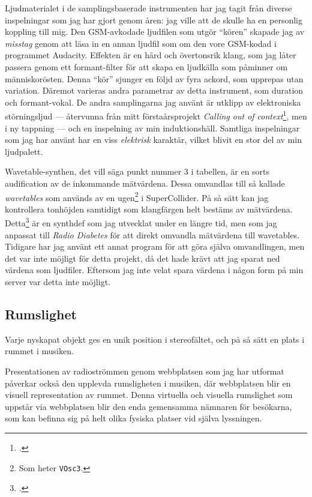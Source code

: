 \documentclass[11pt, a4paper]{article} %
\begin{document}
Ljudmaterialet i de samplingsbaserade instrumenten har jag tagit från diverse inspelningar som jag har gjort genom åren: jag ville att de skulle ha en personlig koppling till mig. Den GSM-avkodade ljudfilen som utgör ``kören'' skapade jag av \emph{misstag} genom att läsa in en annan ljudfil som om den vore GSM-kodad i programmet Audacity. Effekten är en hård och övertonsrik klang, som jag låter passera genom ett formant-filter för att skapa en ljudkälla som påminner om människorösten. Denna ``kör'' sjunger en följd av fyra ackord, som upprepas utan variation. Däremot varieras andra parametrar av detta instrument, som duration och formant-vokal. De andra samplingarna jag använt är utklipp av elektroniska störningsljud --- återvunna från mitt förstaårsprojekt \emph{Calling out of context}\footcite{jondell_calling_2019}, men i ny tappning --- och en inspelning av min induktionshäll. Samtliga inspelningar som jag har använt har en viss \emph{elektrisk} karaktär, vilket blivit en stor del av min ljudpalett. 

Wavetable-synthen, det vill säga punkt nummer 3 i tabellen, är en sorts \gls{audification} av de inkommande mätvärdena. Dessa omvandlas till så kallade \emph{wavetables} som används av en \gls{ugen}\footnote{Som heter \texttt{VOsc3}.} i SuperCollider. På så sätt kan jag kontrollera tonhöjden samtidigt som klangfärgen helt bestäms av mätvärdena. Detta\footcite{jondell_kj-jondelldiabetes-synth_2021} är en \gls{synthdef} som jag utvecklat under en längre tid, men som jag anpassat till \emph{Radio Diabetes} för att direkt omvandla mätvärdena till wavetables. Tidigare har jag använt ett annat program för att göra själva omvandlingen, men det var inte möjligt för detta projekt, då det hade krävt att jag sparat ned värdena som ljudfiler. Eftersom jag inte velat spara värdena i någon form på min server var detta inte möjligt.

\subsection*{Rumslighet}
Varje nyskapat objekt ges en unik position i stereofältet, och på så sätt en plats i rummet i musiken. 

Presentationen av radioströmmen genom webbplatsen som jag har utformat påverkar också den upplevda rumsligheten i musiken, där webbplatsen blir en visuell representation av rummet. Denna virtuella och visuella rumslighet som uppstår via webbplatsen blir den enda gemensamma nämnaren för besökarna, som kan befinna sig på helt olika fysiska platser vid själva lyssningen.
\end{document}
